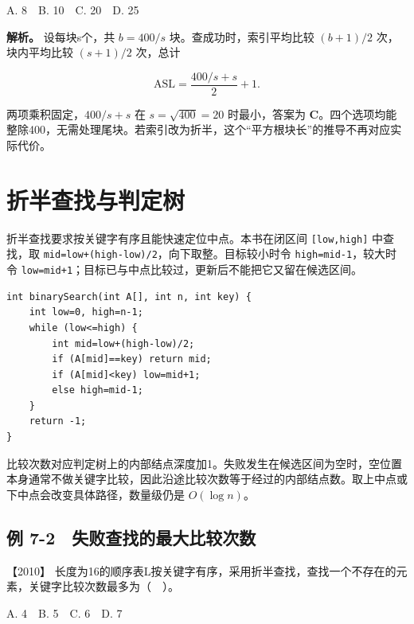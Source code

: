 A. 8　B. 10　C. 20　D. 25


\textbf{解析。} 设每块s个，共 \(b=400/s\) 块。查成功时，索引平均比较 \((b+1)/2\) 次，块内平均比较 \((s+1)/2\) 次，总计

\[\mathrm{ASL}=\frac{400/s+s}{2}+1.\]

两项乘积固定，\(400/s+s\) 在 \(s=\sqrt{400}=20\) 时最小，答案为 \textbf{C}。四个选项均能整除400，无需处理尾块。若索引改为折半，这个``平方根块长''的推导不再对应实际代价。

\section{折半查找与判定树}\label{ds-07-03}

折半查找要求按关键字有序且能快速定位中点。本书在闭区间 \allowbreak{}\texttt{{[}low,}\allowbreak{}\texttt{high{]}} 中查找，取 \allowbreak{}\texttt{mid=low+(high-low)/2}，向下取整。目标较小时令 \allowbreak{}\texttt{high=mid-1}，较大时令 \allowbreak{}\texttt{low=mid+1}；目标已与中点比较过，更新后不能把它又留在候选区间。

\par\medskip\noindent
\begin{minipage}{\linewidth}
\begin{verbatim}
int binarySearch(int A[], int n, int key) {
    int low=0, high=n-1;
    while (low<=high) {
        int mid=low+(high-low)/2;
        if (A[mid]==key) return mid;
        if (A[mid]<key) low=mid+1;
        else high=mid-1;
    }
    return -1;
}
\end{verbatim}
\end{minipage}\par\medskip

比较次数对应判定树上的内部结点深度加1。失败发生在候选区间为空时，空位置本身通常不做关键字比较，因此沿途比较次数等于经过的内部结点数。取上中点或下中点会改变具体路径，数量级仍是 \(O(\log n)\)。

\subsection{例 7-2　失败查找的最大比较次数}\label{ds-ex7-2}

\noindent{}【2010】 长度为16的顺序表L按关键字有序，采用折半查找，查找一个不存在的元素，关键字比较次数最多为（　）。

A. 4　B. 5　C. 6　D. 7


